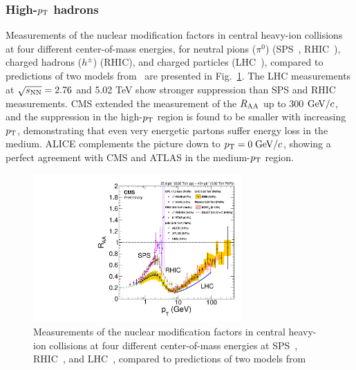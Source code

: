 \subsubsection{High-$p_{\rm T}$ hadrons}
Measurements of the nuclear modification factors in central heavy-ion collisions at four different center-of-mass energies, for neutral pions ($\pi^0$) (SPS~\cite{Aggarwal:2001gn,dEnterria:2004cly,Alt:2007cd}, RHIC~\cite{Adare:2012wg}), charged hadrons ($h^{\pm}$) (RHIC\cite{Adams:2003kv}), and charged particles (LHC~\cite{Abelev:2012hxa,Aad:2015wga,CMS:2012aa}), compared to predictions of two models from~\cite{Chien:2015vja,Xu:2015bbz} are presented in Fig.~\ref{fig:CMSRaa}. The LHC measurements at $\sqrt{s_{\rm NN}} = 2.76$ and 5.02 TeV show stronger suppression than SPS and RHIC measurements. CMS extended the measurement of the $R_{\rm AA}$ up to 300 $\mathrm{GeV}/c$, and the suppression in the high-$p_{\rm T}$ region is found to be smaller with increasing $p_{\rm T}$, demonstrating that even very energetic partons suffer energy loss in the medium. ALICE complements the picture down to $p_{\rm T} = 0 \; \mathrm{GeV}/c$, showing a perfect agreement with CMS and ATLAS in the medium-$p_{\rm T}$ region.
\begin{figure}[!ht]
  \centering
  \includegraphics[width=8cm]{FigCap1/CMSRaa.pdf}
  \caption{Measurements of the nuclear modification factors in central heavy-ion collisions at four different center-of-mass energies at SPS~\cite{Aggarwal:2001gn,dEnterria:2004cly,Alt:2007cd}, RHIC~\cite{Adare:2012wg,Adams:2003kv}, and LHC~\cite{Abelev:2012hxa,Aad:2015wga,CMS:2012aa}, compared to predictions of two models from~\cite{Chien:2015vja,Xu:2015bbz}}
  \label{fig:CMSRaa}
\end{figure}
